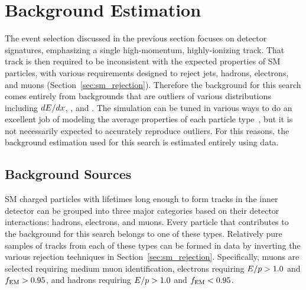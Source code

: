 \chapter{Background Estimation}

\label{ch:background}

The event selection discussed in the previous section focuses on detector signatures, emphasizing a single high-momentum, highly-ionizing track.
That track is then required to be inconsistent with the expected properties of \ac{SM} particles, with various requirements designed to reject jets, hadrons, electrons, and muons (Section~\ref{sec:sm_rejection}).
Therefore the background for this search comes entirely from backgrounds that are outliers of various distributions including $dE/dx$, \emfrac, and \ptcone.
The simulation can be tuned in various ways to do an excellent job of modeling the average properties of each particle type~\cite{atlas_sim}, but it is not necessarily expected to accurately reproduce outliers.
For this reasons, the background estimation used for this search is estimated entirely using data.

\section{Background Sources}
\label{sec:background_sources}
\ac{SM} charged particles with lifetimes long enough to form tracks in the inner detector can be grouped into three major categories based on their detector interactions: hadrons, electrons, and muons. 
Every particle that contributes to the background for this search belongs to one of these types.
Relatively pure samples of tracks from each of these types can be formed in data by inverting the various rejection techniques in Section~\ref{sec:sm_rejection}.
Specifically, muons are selected requiring medium muon identification, electrons requiring $E/p > 1.0$ and $f_\mathrm{EM} > 0.95$, and hadrons requiring $E/p > 1.0$ and $f_\mathrm{EM} < 0.95$. 

